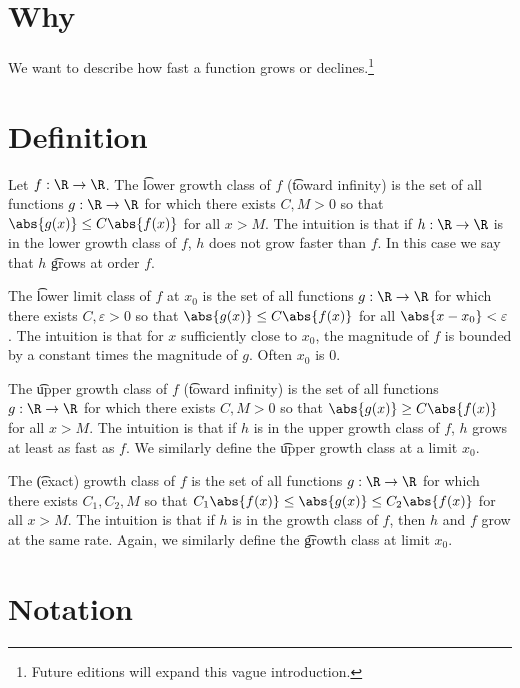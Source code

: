 

\section*{Why}

We want to describe how fast a function grows or declines.\footnote{Future editions will expand this vague introduction.}

\section*{Definition}

Let $f: \R  \to \R $.
The \t{lower growth class} of $f$ (\t{toward infinity}) is the set of all functions $g: \R  \to \R $ for which there exists $C, M > 0$ so that $\abs{g(x)} \leq C\abs{f(x)}$ for all $x > M$.
The intuition is that if $h: \R  \to \R $ is in the lower growth class of $f$, $h$ does not grow faster than $f$.
In this case we say that $h$ \t{grows at order} $f$.

The \t{lower limit class of $f$ at $x_0$} is the set of all functions $g: \R  \to \R $ for which there exists $C, \varepsilon  > 0$ so that $\abs{g(x)} \leq C \abs{f(x)}$ for all $\abs{x - x_0} < \varepsilon $.
The intuition is that for $x$ sufficiently close to $x_0$, the magnitude of $f$ is bounded by a constant times the magnitude of $g$.
Often $x_0$ is $0$.

The \t{upper growth class} of $f$ (\t{toward infinity}) is the set of all functions $g: \R  \to \R $ for which there exists $C, M > 0$ so that $\abs{g(x)} \geq C\abs{f(x)}$ for all $x > M$.
The intuition is that if $h$ is in the upper growth class of $f$, $h$ grows at least as fast as $f$.
We similarly define the \t{upper growth class at a limit $x_0$}.

The \t{(exact) growth class} of $f$ is the set of all functions $g: \R  \to \R $ for which there exists $C_1, C_2, M$ so that $C_1\abs{f(x)} \leq \abs{g(x)} \leq C_2 \abs{f(x)}$ for all $x > M$.
The intuition is that if $h$ is in the growth class of $f$, then $h$ and $f$ grow at the same rate.
Again, we similarly define the \t{growth class at limit $x_0$}.

\section*{Notation}

